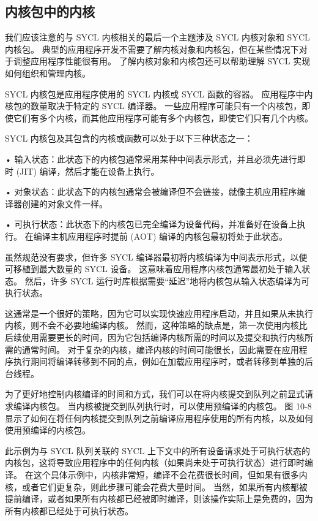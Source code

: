 \subsection{内核包中的内核}
我们应该注意的与 SYCL 内核相关的最后一个主题涉及 SYCL 内核对象和 SYCL 内核包。 典型的应用程序开发不需要了解内核对象和内核包，但在某些情况下对于调整应用程序性能很有用。 了解内核对象和内核包还可以帮助理解 SYCL 实现如何组织和管理内核。

SYCL 内核包是应用程序使用的 SYCL 内核或 SYCL 函数的容器。 应用程序中内核包的数量取决于特定的 SYCL 编译器。 一些应用程序可能只有一个内核包，即使它们有多个内核，而其他应用程序可能有多个内核包，即使它们只有几个内核。

SYCL 内核包及其包含的内核或函数可以处于以下三种状态之一：

• 输入状态：此状态下的内核包通常采用某种中间表示形式，并且必须先进行即时 (JIT) 编译，然后才能在设备上执行。

• 对象状态：此状态下的内核包通常会被编译但不会链接，就像主机应用程序编译器创建的对象文件一样。

• 可执行状态：此状态下的内核包已完全编译为设备代码，并准备好在设备上执行。 在编译主机应用程序时提前 (AOT) 编译的内核包最初将处于此状态。

虽然规范没有要求，但许多 SYCL 编译器最初将内核编译为中间表示形式，以便可移植到最大数量的 SYCL 设备。 这意味着应用程序内核包通常最初处于输入状态。 然后，许多 SYCL 运行时库根据需要“延迟”地将内核包从输入状态编译为可执行状态。

这通常是一个很好的策略，因为它可以实现快速应用程序启动，并且如果从未执行内核，则不会不必要地编译内核。 然而，这种策略的缺点是，第一次使用内核比后续使用需要更长的时间，因为它包括编译内核所需的时间以及提交和执行内核所需的通常时间。 对于复杂的内核，编译内核的时间可能很长，因此需要在应用程序执行期间将编译转移到不同的点，例如在加载应用程序时，或者转移到单独的后台线程。

为了更好地控制内核编译的时间和方式，我们可以在将内核提交到队列之前显式请求编译内核包。 当内核被提交到队列执行时，可以使用预编译的内核包。 图 10-8 显示了如何在将任何内核提交到队列之前编译应用程序使用的所有内核，以及如何使用预编译的内核包。

此示例为与 SYCL 队列关联的 SYCL 上下文中的所有设备请求处于可执行状态的内核包，这将导致应用程序中的任何内核（如果尚未处于可执行状态）进行即时编译。 在这个具体示例中，内核非常短，编译不会花费很长时间，但如果有很多内核，或者它们更复杂，则此步骤可能会花费大量时间。 当然，如果所有内核都被提前编译，或者如果所有内核都已经被即时编译，则该操作实际上是免费的，因为所有内核都已经处于可执行状态。


